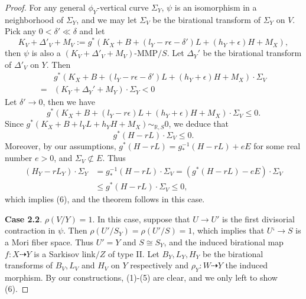 \documentclass[11pt]{amsart}
\numberwithin{equation}{section}
\theoremstyle{definition}
\theoremstyle{remark}
\theoremstyle{definition}
\begin{document}
\begin{proof}
For any general $\phi_Y$-vertical curve $\Sigma_Y$, $\psi$ is an isomorphism in a neighborhood of $\Sigma_Y$, and we may let $\Sigma_V$ be the birational transform of $\Sigma_Y$ on $V$. Pick any $0<\delta'\ll\delta$ and let
$$K_V+\Delta'_V+M_V:=g^*(K_X+B+(l_Y-r\epsilon-\delta')L+(h_Y+\epsilon)H+M_X),$$
then $\psi$ is also a $(K_V+\Delta'_V+M_V)$-MMP$/S$. Let $\Delta_Y'$ be the birational transform of $\Delta'_V$ on $Y$. Then
\begin{align*}
&g^*(K_X+B+(l_Y-r\epsilon-\delta')L+(h_Y+\epsilon)H+M_X)\cdot\Sigma_V\\
=&(K_Y+\Delta_Y'+M_Y)\cdot\Sigma_Y<0
\end{align*}
Let $\delta'\rightarrow 0$, then we have
$$g^*(K_X+B+(l_Y-r\epsilon)L+(h_Y+\epsilon)H+M_X)\cdot\Sigma_V\leq 0.$$
Since $g^*(K_X+B+l_YL+h_YH+M_X)\sim_{\mathbb R,S}0$, we deduce that
$$g^*(H-rL)\cdot\Sigma_V\leq 0.$$
Moreover, by our assumptions, $g^*(H-rL)=g^{-1}_*(H-rL)+eE$ for some real number $e>0$, and $\Sigma_V\not\subset E$. Thus
\begin{align*}
    (H_Y-rL_Y)\cdot\Sigma_Y&=g^{-1}_*(H-rL)\cdot\Sigma_V=(g^*(H-rL)-eE)\cdot\Sigma_V\\
    &\leq g^*(H-rL)\cdot\Sigma_V\leq 0,
\end{align*}
which implies (6), and the theorem follows in this case.

\medskip

\noindent\textbf{Case 2.2}. $\rho(V/Y)=1$. In this case, suppose that $U\rightarrow U'$ is the first divisorial contraction in $\psi$. Then $\rho(U'/S_Y)=\rho(U'/S)=1$, which implies that $U‘\rightarrow S$ is a Mori fiber space. Thus $U'=Y$ and $S\cong S_Y$, and the induced birational map $f:X\dashrightarrow Y$ is a Sarkisov link$/Z$ of type II. Let $B_Y,L_Y,H_Y$ be the birational transforms of $B_V,L_V$ and $H_V$ on $Y$ respectively and $\rho_Y: W\dashrightarrow Y$ the induced morphism. By our constructions, (1)-(5) are clear, and we only left to show (6).


\end{proof}
\end{document}
